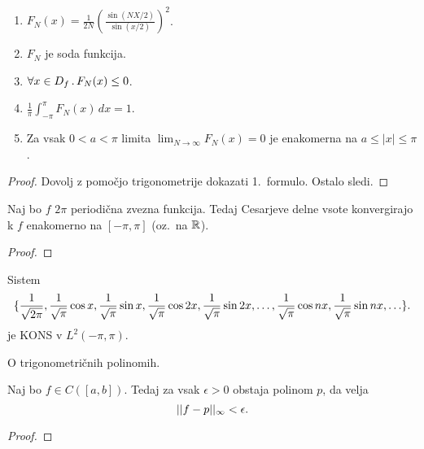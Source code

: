 \begin{trditev}
    \ 
    \begin{enumerate}
        \item \(F_N(x) = \frac{1}{2N} \left(\frac{\sin(NX/2)}{\sin(x/2)}\right)^2\).
        \item \(F_N\) je soda funkcija.
        \item \(\forall x \in D_f \,.\, F_N(x) \leq 0\).
        \item \(\frac{1}{\pi} \int_{-\pi}^{\pi} F_N(x) \, dx = 1\).
        \item Za vsak \(0 < a < \pi\) limita \(\lim_{N \to \infty} F_N(x) = 0\) je enakomerna na \(a \leq |x| \leq \pi\).
    \end{enumerate}
\end{trditev}

\begin{proof}
    Dovolj z pomočjo trigonometrije dokazati 1.\ formulo. Ostalo sledi.
\end{proof}

\begin{izrek}
    Naj bo \(f\) \(2\pi\) periodična zvezna funkcija. Tedaj Cesarjeve delne vsote konvergirajo k \(f\) enakomerno na \([-\pi, \pi]\) (oz.\ na \(\mathbb{R}\)).
\end{izrek}

\begin{proof}
    \todo{}
\end{proof}

\begin{izrek}
    Sistem
    \[
        \{\frac{1}{\sqrt{2\pi}}, \frac{1}{\sqrt{\pi}} \cos x, \frac{1}{\sqrt{\pi}} \sin x, \frac{1}{\sqrt{\pi}} \cos 2x, \frac{1}{\sqrt{\pi}} \sin 2x, \ldots, \frac{1}{\sqrt{\pi}} \cos nx, \frac{1}{\sqrt{\pi}} \sin nx, \ldots\}.
    \]
    je KONS v \(L^2(-\pi, \pi)\).
\end{izrek}

\begin{opomba}
    O trigonometričnih polinomih. \todo{}
\end{opomba}

\begin{izrek}
    Naj bo \(f \in C([a,b])\). Tedaj za vsak \(\epsilon > 0\) obstaja polinom \(p\), da velja 
    \[
        ||f - p||_\infty < \epsilon.
    \]
\end{izrek}

\begin{proof}
    \todo{}
\end{proof}


